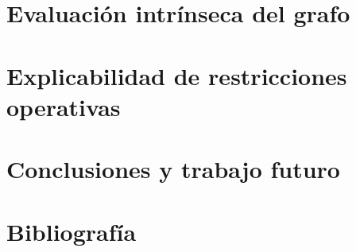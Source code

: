 \documentclass[12pt,a4paper]{report}
\begin{document}
\chapter{Evaluación intrínseca del grafo}
\label{cap:intrinseca}

\chapter{Explicabilidad de restricciones operativas}
\label{cap:explicabilidad} %


\chapter{Conclusiones y trabajo futuro}
\label{sec:conclusiones}

\chapter{Bibliografía}
\printbibliography[heading=none]

\appendix
\end{document}
